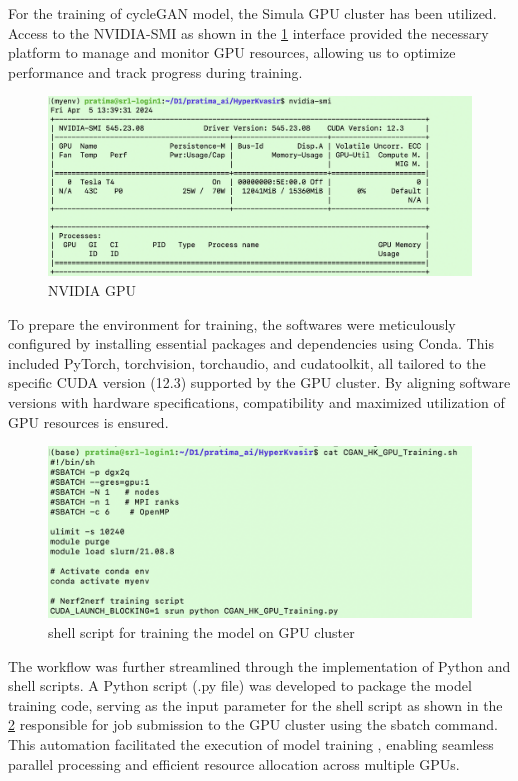 \documentclass[UKenglish,12pt]{master-style}
\begin{document}
For the training of cycleGAN model, the Simula GPU cluster has been utilized. Access to the NVIDIA-SMI as shown in the \ref{fig:GPU} interface provided the necessary platform to manage and monitor GPU resources, allowing us to optimize performance and track progress during training.
 
\begin{figure}[htbp]
    \centering
    \includegraphics[width=1\textwidth]{Images/GPU.png}
    \caption{NVIDIA GPU}
    \label{fig:GPU}
\end{figure}

To prepare the environment for training, the softwares were meticulously configured by installing essential packages and dependencies using Conda. This included PyTorch, torchvision, torchaudio, and cudatoolkit, all tailored to the specific CUDA version (12.3) supported by the GPU cluster. By aligning software versions with hardware specifications, compatibility and maximized utilization of GPU resources is ensured.

\begin{figure}[htbp]
    \centering
    \includegraphics[width=1\textwidth]{Images/sbatch.png}
    \caption{shell script for training the model on GPU cluster}
    \label{fig:sbatch}
\end{figure}

The workflow was further streamlined through the implementation of Python and shell scripts. A Python script (.py file) was developed to package the model training code, serving as the input parameter for the shell script as shown in the \ref{fig:sbatch} responsible for job submission to the GPU cluster using the sbatch command. This automation facilitated the execution of model training , enabling seamless parallel processing and efficient resource allocation across multiple GPUs.
\end{document}
